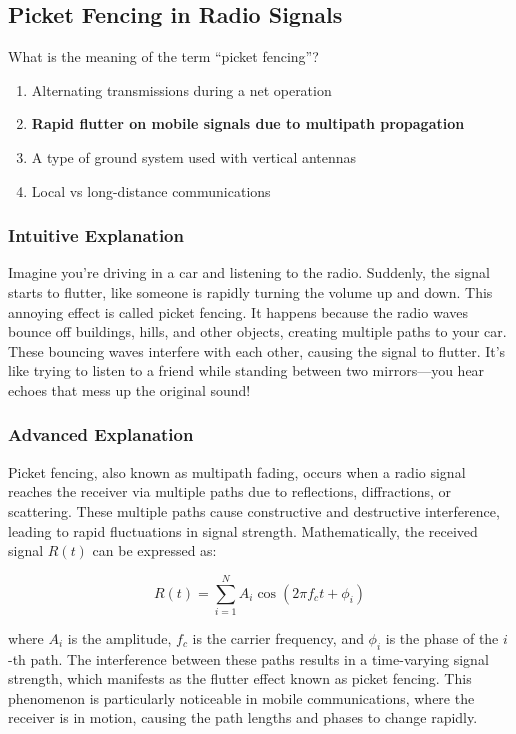\subsection{Picket Fencing in Radio Signals}
\label{T3A06}

\begin{tcolorbox}[colback=gray!10!white,colframe=black!75!black,title=T3A06]
What is the meaning of the term “picket fencing”?
\begin{enumerate}[label=\Alph*]
    \item Alternating transmissions during a net operation
    \item \textbf{Rapid flutter on mobile signals due to multipath propagation}
    \item A type of ground system used with vertical antennas
    \item Local vs long-distance communications
\end{enumerate}
\end{tcolorbox}

\subsubsection{Intuitive Explanation}
Imagine you're driving in a car and listening to the radio. Suddenly, the signal starts to flutter, like someone is rapidly turning the volume up and down. This annoying effect is called picket fencing. It happens because the radio waves bounce off buildings, hills, and other objects, creating multiple paths to your car. These bouncing waves interfere with each other, causing the signal to flutter. It's like trying to listen to a friend while standing between two mirrors—you hear echoes that mess up the original sound!

\subsubsection{Advanced Explanation}
Picket fencing, also known as multipath fading, occurs when a radio signal reaches the receiver via multiple paths due to reflections, diffractions, or scattering. These multiple paths cause constructive and destructive interference, leading to rapid fluctuations in signal strength. Mathematically, the received signal \( R(t) \) can be expressed as:

\[
R(t) = \sum_{i=1}^{N} A_i \cos(2\pi f_c t + \phi_i)
\]

where \( A_i \) is the amplitude, \( f_c \) is the carrier frequency, and \( \phi_i \) is the phase of the \( i \)-th path. The interference between these paths results in a time-varying signal strength, which manifests as the flutter effect known as picket fencing. This phenomenon is particularly noticeable in mobile communications, where the receiver is in motion, causing the path lengths and phases to change rapidly.

